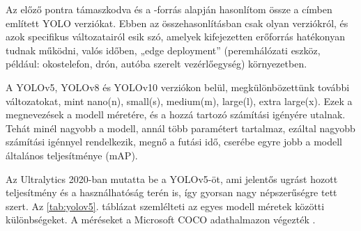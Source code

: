 Az előző  pontra támaszkodva és a 
\cite{hussainYOLOv5YOLOv8YOLOv102024}-forrás alapján hasonlítom össze a címben említett YOLO
verziókat. Ebben az összehasonlításban csak olyan verziókról, és azok
specifikus változatairól esik szó, amelyek kifejezetten erőforrás
hatékonyan tudnak működni, valós időben, „edge deployment'' \cite{hussainYOLOv5YOLOv8YOLOv102024}
(peremhálózati eszköz, például: okostelefon, drón, autóba szerelt
vezérlőegység) környezetben.

A YOLOv5, YOLOv8 és YOLOv10 verziókon belül, megkülönbözettünk további
változatokat, mint nano(n), small(s), medium(m), large(l), extra
large(x). Ezek a megnevezések a modell méretére, és a hozzá tartozó
számítási igényére utalnak. Tehát minél nagyobb a modell, annál több
paramétert tartalmaz, ezáltal nagyobb számítási igénnyel rendelkezik,
megnő a futási idő, cserébe egyre jobb a modell általános teljesítménye
(mAP).

Az Ultralytics 2020-ban mutatta be a YOLOv5-öt, ami jelentős ugrást
hozott teljesítmény és a használhatóság terén is, így gyorsan nagy
népszerűségre tett szert. Az \ref{tab:yolov5}. táblázat
szemlélteti az egyes modell méretek közötti különbségeket. A méréseket a
Microsoft COCO adathalmazon végezték \cite{hussainYOLOv5YOLOv8YOLOv102024}.

\begin{table}[htbp]
	\centering
	\caption{YOLOv5 verziók összehasonlítása \protect\cite{hussainYOLOv5YOLOv8YOLOv102024}}
	\label{tab:yolov5}
	\vspace{0.2cm}
	
\end{table}

